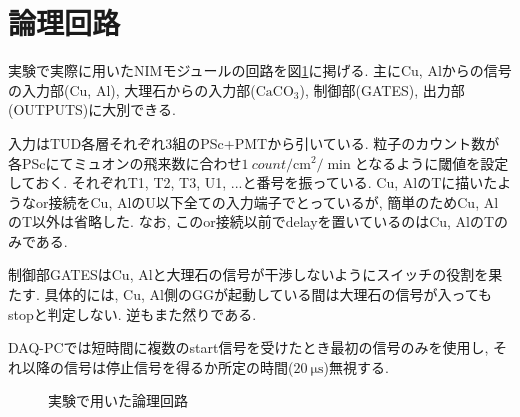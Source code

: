 \documentclass[dvipdfmx]{jsarticle}
\begin{document}
\appendix


\section{論理回路}
\label{sec: logic circuit}

実験で実際に用いたNIMモジュールの回路を図\ref{fig: full circuit}に掲げる.
主にCu, Alからの信号の入力部(Cu, Al), 大理石からの入力部($\mathrm{CaCO_3}$), 制御部(GATES), 出力部(OUTPUTS)に大別できる.

入力はTUD各層それぞれ3組のPSc+PMTから引いている.
粒子のカウント数が各PScにてミュオンの飛来数に合わせ$\SI{1}{count/\cm^2/\min}$となるように閾値を設定しておく\cite{Grupen}.
それぞれT1, T2, T3, U1, ...と番号を振っている.
Cu, AlのTに描いたようなor接続をCu, AlのU以下全ての入力端子でとっているが, 簡単のためCu, AlのT以外は省略した.
なお, このor接続以前でdelayを置いているのはCu, AlのTのみである.

制御部GATESはCu, Alと大理石の信号が干渉しないようにスイッチの役割を果たす.
具体的には, Cu, Al側のGGが起動している間は大理石の信号が入ってもstopと判定しない.
逆もまた然りである.

DAQ-PCでは短時間に複数のstart信号を受けたとき最初の信号のみを使用し, それ以降の信号は停止信号を得るか所定の時間($\SI{20}{\micro\second}$)無視する.

\begin{landscape}
    \begin{figure}
        \centering
        
        \caption{実験で用いた論理回路}
        \label{fig: full circuit}
    \end{figure}
\end{landscape}




\end{document}
